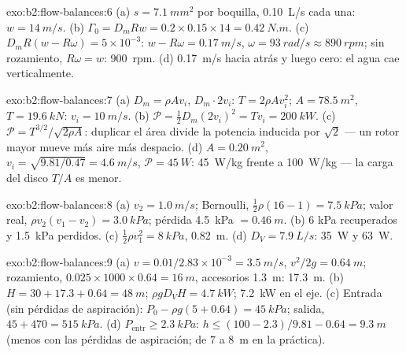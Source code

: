 \begin{solution}{exo:b2:flow-balances:6}
(a) $s = \qty{7.1}{mm^2}$ por boquilla, \qty{0.10}{L/s} cada una: $w = \qty{14}{m/s}$. (b)
$\Gamma_0 = D_mRw = 0.2 \times 0.15 \times 14 = \qty{0.42}{N.m}$. (c) $D_mR(w - R\omega) =
5 \times 10^{-3}$: $w - R\omega = \qty{0.17}{m/s}$, $\omega = \qty{93}{rad/s} \approx \qty{890}{rpm}$;
sin rozamiento, $R\omega = w$: \qty{900}{rpm}. (d) \qty{0.17}{m/s} hacia atrás y luego
cero: el agua cae verticalmente.
\end{solution}

\begin{solution}{exo:b2:flow-balances:7}
(a) $D_m = \rho Av_i$,  $D_m\cdot2v_i$: $T = 2\rho Av_i^2$; $A = \qty{78.5}{m^2}$,
$T = \qty{19.6}{kN}$: $v_i = \qty{10}{m/s}$. (b) $\mathcal P = \tfrac12D_m(2v_i)^2 = Tv_i =
\qty{200}{kW}$. (c) $\mathcal P = T^{3/2}/\sqrt{2\rho A}$: duplicar el área
divide la potencia inducida por $\sqrt2$ --- un rotor mayor mueve más aire
más despacio. (d) $A = \qty{0.20}{m^2}$, $v_i = \sqrt{9.81/0.47} = \qty{4.6}{m/s}$, $\mathcal P
= \qty{45}{W}$: \qty{45}{W/kg} frente a \qty{100}{W/kg} --- la carga del disco $T/A$
es menor.
\end{solution}

\begin{solution}{exo:b2:flow-balances:8}
(a) $v_2 = \qty{1.0}{m/s}$; Bernoulli, $\tfrac12\rho(16 - 1) = \qty{7.5}{kPa}$; valor real,
$\rho v_2(v_1 - v_2) = \qty{3.0}{kPa}$; pérdida \qty{4.5}{kPa} $= \qty{0.46}{m}$. (b) $6$ kPa
recuperados y \qty{1.5}{kPa} perdidos. (c) $\tfrac12\rho v_1^2 = \qty{8}{kPa}$, \qty{0.82}{m}. (d)
$D_V = \qty{7.9}{L/s}$: \qty{35}{W} y \qty{63}{W}.
\end{solution}

\begin{solution}{exo:b2:flow-balances:9}
(a) $v = 0.01/2.83 \times 10^{-3} = \qty{3.5}{m/s}$, $v^2/2g = \qty{0.64}{m}$; rozamiento,
$0.025 \times 1000 \times 0.64 = \qty{16}{m}$, accesorios \qty{1.3}{m}: \qty{17.3}{m}. (b)
$H = 30 + 17.3 + 0.64 = \qty{48}{m}$; $\rho gD_VH = \qty{4.7}{kW}$; \qty{7.2}{kW} en el
eje. (c) Entrada (sin pérdidas de aspiración): $P_0 - \rho g(5 + 0.64) = \qty{45}{kPa}$;
salida, $45 + 470 = \qty{515}{kPa}$. (d) $P_{\text{entr}} \ge \qty{2.3}{kPa}$: $h \le (100 -
2.3)/9.81 - 0.64 = \qty{9.3}{m}$ (menos con las pérdidas de aspiración; de $7$ a \qty{8}{m} en
la práctica).
\end{solution}

